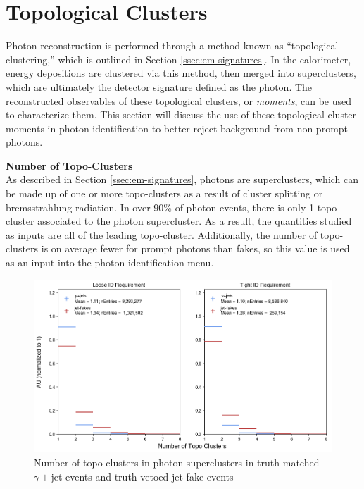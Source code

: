 \section{Topological Clusters}

Photon reconstruction is performed through a method known as ``topological clustering,'' which is outlined in Section \ref{ssec:em-signatures}. In the calorimeter, energy depositions are clustered via this method, then merged into superclusters, which are ultimately the detector signature defined as the photon. The reconstructed observables of these topological clusters, or \textit{moments}, can be used to characterize them. This section will discuss the use of these topological cluster moments in photon identification to better reject background from non-prompt photons.

\noindent\textbf{Number of Topo-Clusters}\\
\indent As described in Section \ref{ssec:em-signatures}, photons are  superclusters, which can be made up of one or more topo-clusters as a result of cluster splitting or bremsstrahlung radiation. In over 90\% of photon events, there is only 1 topo-cluster associated to the photon supercluster. As a result, the quantities studied as inputs are all of the leading topo-cluster. Additionally, the number of topo-clusters is on average fewer for prompt photons than fakes, so this value is used as an input into the photon identification menu.


\begin{figure}[!thp]
    \centering
    \includegraphics[width=.90\textwidth]{chapters/chapter4_photonID/images/hists/y_nTopoClusters.png}
    \caption[Number of topo-clusters in photon superclusters]
    {Number of topo-clusters in photon superclusters in truth-matched $\gamma+$jet events and truth-vetoed jet fake events} 
    \label{fig:topo-geom}
\end{figure}



